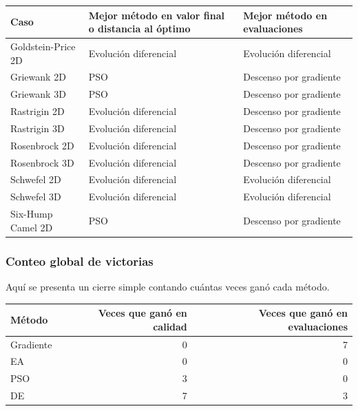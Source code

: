 \documentclass[
  12pt,
  letterpaper,
  DIV=11,
  numbers=noendperiod]{scrartcl}
\newcounter{none} %
\begin{document}
{\def\LTcaptype{none} %
\begin{longtable}[]{@{}
  >{\raggedright\arraybackslash}p{}
  >{\raggedright\arraybackslash}p{}
  >{\raggedright\arraybackslash}p{}@{}}
\toprule\noalign{}
\begin{minipage}[b]{\linewidth}\raggedright
Caso
\end{minipage} & \begin{minipage}[b]{\linewidth}\raggedright
Mejor método en valor final o distancia al óptimo
\end{minipage} & \begin{minipage}[b]{\linewidth}\raggedright
Mejor método en evaluaciones
\end{minipage} \\
\midrule\noalign{}
\endhead
\bottomrule\noalign{}
\endlastfoot
Goldstein-Price 2D & Evolución diferencial & Evolución diferencial \\
Griewank 2D & PSO & Descenso por gradiente \\
Griewank 3D & PSO & Descenso por gradiente \\
Rastrigin 2D & Evolución diferencial & Descenso por gradiente \\
Rastrigin 3D & Evolución diferencial & Descenso por gradiente \\
Rosenbrock 2D & Evolución diferencial & Descenso por gradiente \\
Rosenbrock 3D & Evolución diferencial & Descenso por gradiente \\
Schwefel 2D & Evolución diferencial & Evolución diferencial \\
Schwefel 3D & Evolución diferencial & Evolución diferencial \\
Six-Hump Camel 2D & PSO & Descenso por gradiente \\
\end{longtable}
}

\subsubsection{Conteo global de
victorias}\label{conteo-global-de-victorias}

Aquí se presenta un cierre simple contando cuántas veces ganó cada
método.

{\def\LTcaptype{none} %
\begin{longtable}[]{@{}lrr@{}}
\toprule\noalign{}
Método & Veces que ganó en calidad & Veces que ganó en evaluaciones \\
\midrule\noalign{}
\endhead
\bottomrule\noalign{}
\endlastfoot
Gradiente & 0 & 7 \\
EA & 0 & 0 \\
PSO & 3 & 0 \\
DE & 7 & 3 \\
\end{longtable}
}
\end{document}
